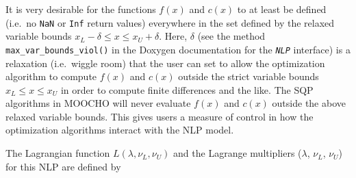 \documentclass[pdf,ps2pdf,11pt]{SANDreport}
\begin{document}
It is very desirable for the functions $f(x)$ and $c(x)$ to at least be
defined (i.e.\ no {}\texttt{NaN} or {}\texttt{Inf} return values) everywhere
in the set defined by the relaxed variable bounds $x_L - \delta \leq x \leq
x_U +
{}\delta$.  Here, $\delta$ (see the method
{}\texttt{max\_var\_bounds\_viol()} in the Doxygen documentation for the
{}\texttt{\textit{NLP}} interface) is a relaxation (i.e.\ wiggle room)
that the user can set to allow the optimization algorithm to compute
$f(x)$ and $c(x)$ outside the strict variable bounds $x_L \le x \le
x_U$ in order to compute finite differences and the like.  The SQP
algorithms in MOOCHO will never evaluate $f(x)$ and $c(x)$ outside the
above relaxed variable bounds.  This gives users a measure of control
in how the optimization algorithms interact with the NLP model.

%
%

The Lagrangian function $L(\lambda, \nu_L, \nu_U)$ and the Lagrange multipliers ($\lambda$, $\nu_L$, $\nu_U$) for this
NLP are defined by
\end{document}
